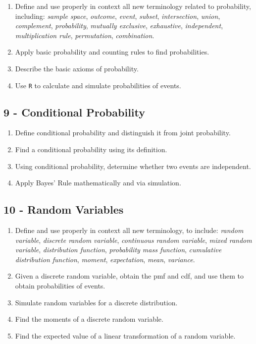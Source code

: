 \documentclass[
  letterpaper,
  DIV=11,
  numbers=noendperiod]{scrreprt}
\begin{document}
\begin{enumerate}
\def\labelenumi{\arabic{enumi})}
\item
  Define and use properly in context all new terminology related to
  probability, including: \emph{sample space}, \emph{outcome},
  \emph{event}, \emph{subset}, \emph{intersection}, \emph{union},
  \emph{complement}, \emph{probability}, \emph{mutually exclusive},
  \emph{exhaustive}, \emph{independent}, \emph{multiplication rule},
  \emph{permutation}, \emph{combination}.
\item
  Apply basic probability and counting rules to find probabilities.
\item
  Describe the basic axioms of probability.
\item
  Use \texttt{R} to calculate and simulate probabilities of events.
\end{enumerate}

\subsection*{9 - Conditional Probability}\label{conditional-probability}

\begin{enumerate}
\def\labelenumi{\arabic{enumi})}
\item
  Define conditional probability and distinguish it from joint
  probability.
\item
  Find a conditional probability using its definition.
\item
  Using conditional probability, determine whether two events are
  independent.
\item
  Apply Bayes' Rule mathematically and via simulation.
\end{enumerate}

\subsection*{10 - Random Variables}\label{random-variables}

\begin{enumerate}
\def\labelenumi{\arabic{enumi})}
\item
  Define and use properly in context all new terminology, to include:
  \emph{random variable}, \emph{discrete random variable},
  \emph{continuous random variable}, \emph{mixed random variable},
  \emph{distribution function}, \emph{probability mass function},
  \emph{cumulative distribution function}, \emph{moment},
  \emph{expectation}, \emph{mean}, \emph{variance}.
\item
  Given a discrete random variable, obtain the pmf and cdf, and use them
  to obtain probabilities of events.
\item
  Simulate random variables for a discrete distribution.
\item
  Find the moments of a discrete random variable.
\item
  Find the expected value of a linear transformation of a random
  variable.
\end{enumerate}
\end{document}
